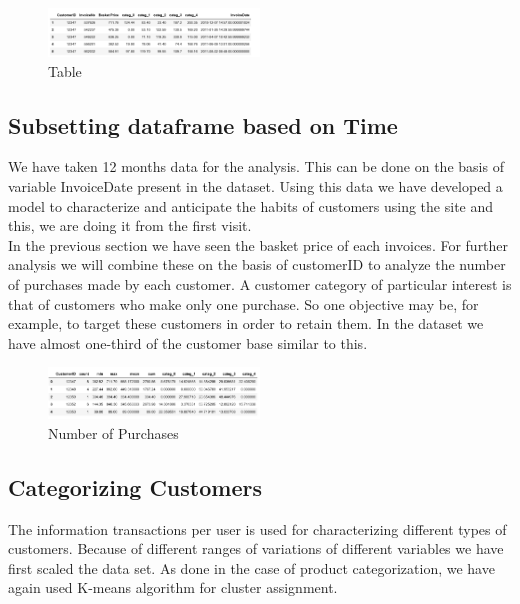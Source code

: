\begin{figure}[H]
\caption{Table}
\label{4.1}
\centering
\includegraphics[width=0.5\textwidth]{images/4_1.PNG}
\end{figure}


\subsection{Subsetting dataframe based on Time}


We have taken 12 months data for the analysis. This can be done on the basis of variable InvoiceDate present in the dataset. Using this data we have developed a model to characterize and anticipate the habits of customers using the site and this, we are doing it from the first visit.\\

In the previous section we have seen the basket price of each invoices. For further analysis we will combine these on the basis of customerID to analyze the number of purchases made by each customer. A customer category of particular interest is that of customers who make only one purchase. So one objective may be, for example, to target these customers in order to retain them. In the dataset we have almost one-third of the customer base similar to this.

\begin{figure}[H]
\caption{Number of Purchases}
\label{4.2}
\centering
\includegraphics[width=0.5\textwidth]{images/4_2.PNG}
\end{figure}


\subsection{Categorizing Customers}

The information transactions per user is used for characterizing different types of customers. Because of different ranges of variations of different variables we have first scaled the data set. As done in the case of product categorization, we have again used K-means algorithm for cluster assignment.\\

